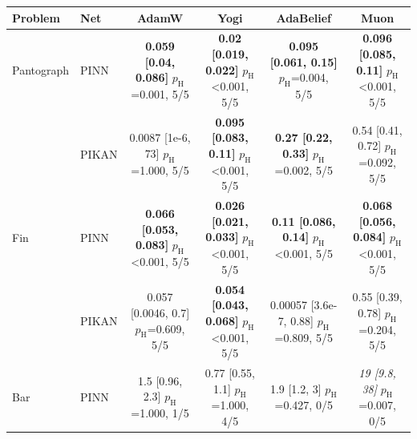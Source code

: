 \begin{tabular}{llcccc}
\toprule
Problem & Net & AdamW & Yogi & AdaBelief & Muon\\
\midrule
Pantograph & PINN & \makecell{\textbf{0.059 [0.04, 0.086]}\\{\scriptsize $p_{\mathrm{H}}$=0.001, 5/5}} & \makecell{\textbf{0.02 [0.019, 0.022]}\\{\scriptsize $p_{\mathrm{H}}$<0.001, 5/5}} & \makecell{\textbf{0.095 [0.061, 0.15]}\\{\scriptsize $p_{\mathrm{H}}$=0.004, 5/5}} & \makecell{\textbf{0.096 [0.085, 0.11]}\\{\scriptsize $p_{\mathrm{H}}$<0.001, 5/5}}\\
 & PIKAN & \makecell{0.0087 [1e-6, 73]\\{\scriptsize $p_{\mathrm{H}}$=1.000, 5/5}} & \makecell{\textbf{0.095 [0.083, 0.11]}\\{\scriptsize $p_{\mathrm{H}}$<0.001, 5/5}} & \makecell{\textbf{0.27 [0.22, 0.33]}\\{\scriptsize $p_{\mathrm{H}}$=0.002, 5/5}} & \makecell{0.54 [0.41, 0.72]\\{\scriptsize $p_{\mathrm{H}}$=0.092, 5/5}}\\
\addlinespace
Fin & PINN & \makecell{\textbf{0.066 [0.053, 0.083]}\\{\scriptsize $p_{\mathrm{H}}$<0.001, 5/5}} & \makecell{\textbf{0.026 [0.021, 0.033]}\\{\scriptsize $p_{\mathrm{H}}$<0.001, 5/5}} & \makecell{\textbf{0.11 [0.086, 0.14]}\\{\scriptsize $p_{\mathrm{H}}$<0.001, 5/5}} & \makecell{\textbf{0.068 [0.056, 0.084]}\\{\scriptsize $p_{\mathrm{H}}$<0.001, 5/5}}\\
 & PIKAN & \makecell{0.057 [0.0046, 0.7]\\{\scriptsize $p_{\mathrm{H}}$=0.609, 5/5}} & \makecell{\textbf{0.054 [0.043, 0.068]}\\{\scriptsize $p_{\mathrm{H}}$<0.001, 5/5}} & \makecell{0.00057 [3.6e-7, 0.88]\\{\scriptsize $p_{\mathrm{H}}$=0.809, 5/5}} & \makecell{0.55 [0.39, 0.78]\\{\scriptsize $p_{\mathrm{H}}$=0.204, 5/5}}\\
\addlinespace
Bar & PINN & \makecell{1.5 [0.96, 2.3]\\{\scriptsize $p_{\mathrm{H}}$=1.000, 1/5}} & \makecell{0.77 [0.55, 1.1]\\{\scriptsize $p_{\mathrm{H}}$=1.000, 4/5}} & \makecell{1.9 [1.2, 3]\\{\scriptsize $p_{\mathrm{H}}$=0.427, 0/5}} & \makecell{\textit{19 [9.8, 38]}\\{\scriptsize $p_{\mathrm{H}}$=0.007, 0/5}}\\

\end{tabular}
